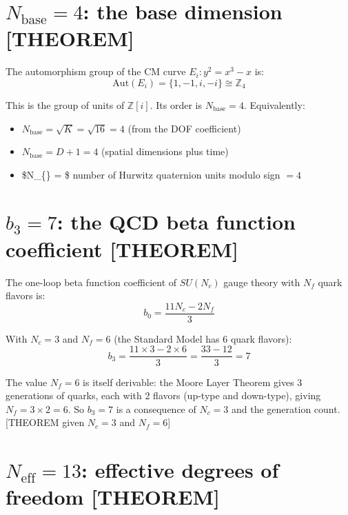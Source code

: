 \documentclass[
  11pt,
  letterpaper,
  twoside,
  openany]{book}
\makeatletter
\providecommand{\tightlist}{%
  \setlength{\itemsep}{0pt}\setlength{\parskip}{0pt}}
\let\orig@section\section
\renewcommand{\section}{\needspace{8\baselineskip}\orig@section}
\makeatother
\begin{document}
\section{\texorpdfstring{\(N_{\text{base}} = 4\): the base dimension
{[}THEOREM{]}}{N\_\{\textbackslash text\{base\}\} = 4: the base dimension {[}THEOREM{]}}}\label{n_textbase-4-the-base-dimension-theorem}

The automorphism group of the CM curve \(E_i: y^2 = x^3 - x\) is: \[
\text{Aut}(E_i) = \{1, -1, i, -i\} \cong \mathbb{Z}_4
\]

This is the group of units of \(\mathbb{Z}[i]\). Its order is
\(N_{\text{base}} = 4\). Equivalently:

\begin{itemize}
\tightlist
\item
  \(N_{\text{base}} = \sqrt{K} = \sqrt{16} = 4\) (from the DOF
  coefficient)
\item
  \(N_{\text{base}} = D + 1 = 4\) (spatial dimensions plus time)
\item
  \$N\_\{\} = \$ number of Hurwitz quaternion units modulo
  sign \(= 4\)
\end{itemize}

\section{\texorpdfstring{\(b_3 = 7\): the QCD beta function coefficient
{[}THEOREM{]}}{b\_3 = 7: the QCD beta function coefficient {[}THEOREM{]}}}\label{b_3-7-the-qcd-beta-function-coefficient-theorem}

The one-loop beta function coefficient of \(SU(N_c)\) gauge theory with
\(N_f\) quark flavors is: \[
b_0 = \frac{11N_c - 2N_f}{3}
\]

With \(N_c = 3\) and \(N_f = 6\) (the Standard Model has 6 quark
flavors): \[
b_3 = \frac{11 \times 3 - 2 \times 6}{3} = \frac{33 - 12}{3} = 7
\]

The value \(N_f = 6\) is itself derivable: the Moore Layer Theorem gives
3 generations of quarks, each with 2 flavors (up-type and down-type),
giving \(N_f = 3 \times 2 = 6\). So \(b_3 = 7\) is a consequence of
\(N_c = 3\) and the generation count. {[}THEOREM given \(N_c = 3\) and
\(N_f = 6\){]}

\section{\texorpdfstring{\(N_{\text{eff}} = 13\): effective degrees of
freedom
{[}THEOREM{]}}{N\_\{\textbackslash text\{eff\}\} = 13: effective degrees of freedom {[}THEOREM{]}}}\label{n_texteff-13-effective-degrees-of-freedom-theorem}
\end{document}
